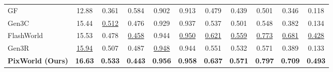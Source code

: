 \begin{table}[t]
{\begin{tabular}{l ccc cccc ccc}
GF~\citep{wu2025geometry}           & 12.88 & 0.361 & 0.584 & 0.902 & 0.913 & 0.479 & 0.439 & 0.501 & 0.346 & 0.118 \\
Gen3C~\citep{ren2025gen3c}          & 15.44 & \underline{0.512} & 0.476 & 0.929 & 0.937 & 0.537 & 0.501 & 0.548 & 0.382 & 0.134 \\
FlashWorld~\citep{li2025flashworld} & 15.53 & 0.478 & \underline{0.458} & 0.944 & \underline{0.950} & \underline{0.621} & \underline{0.559} & \underline{0.773} & \underline{0.681} & \underline{0.428} \\
Gen3R~\citep{huang2026gen3r}        & \underline{15.94} & 0.507 & 0.487 & \underline{0.948} & 0.944 & 0.551 & 0.532 & 0.571 & 0.389 & 0.133 \\
\rowcolor{cyan!8}
\textbf{PixWorld (Ours)}           & \textbf{16.63} & \textbf{0.533} & \textbf{0.443} & \textbf{0.956} & \textbf{0.958} & \textbf{0.637} & \textbf{0.571} & \textbf{0.797} & \textbf{0.709} & \textbf{0.493} \\
\bottomrule
\end{tabular}}
\end{table}